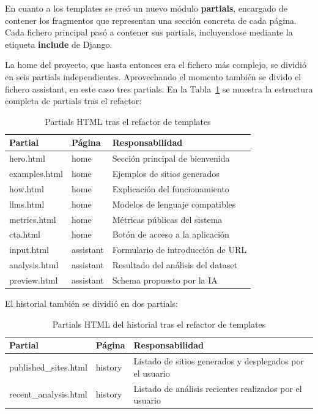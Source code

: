 En cuanto a los templates se creó un nuevo módulo \textbf{partials}, encargado de contener los fragmentos que representan una sección concreta de cada página. Cada fichero principal pasó a contener sus partials, incluyendose mediante la etiqueta \textbf{include} de Django.

La home del proyecto, que hasta entonces era el fichero más complejo, se dividió en seis partials independientes. Aprovechando el momento también se divido el fichero assistant, en este caso tres partials. En la Tabla~\ref{tab:partials-html} se muestra la estructura completa de partials tras el refactor:

\begin{table}[H]
    \centering
    \begin{tabular}{|l|l|p{5cm}|}
        \hline
        \textbf{Partial} & \textbf{Página} & \textbf{Responsabilidad} \\
        \hline
        hero.html & home & Sección principal de bienvenida \\
        \hline
        examples.html & home & Ejemplos de sitios generados \\
        \hline
        how.html & home & Explicación del funcionamiento \\
        \hline
        llms.html & home & Modelos de lenguaje compatibles \\
        \hline
        metrics.html & home & Métricas públicas del sistema \\
        \hline
        cta.html & home & Botón de acceso a la aplicación \\
        \hline
        input.html & assistant & Formulario de introducción de URL \\
        \hline
        analysis.html & assistant & Resultado del análisis del dataset \\
        \hline
        preview.html & assistant & Schema propuesto por la IA \\
        \hline
    \end{tabular}
    \caption{Partials HTML tras el refactor de templates}
    \label{tab:partials-html}
\end{table}

El historial también se dividió en dos partials:

\begin{table}[H]
    \centering
    \begin{tabular}{|l|l|p{5cm}|}
    \hline
    \textbf{Partial} & \textbf{Página} & \textbf{Responsabilidad} \\
    \hline
        published\_sites.html & history & Listado de sitios generados y desplegados por el usuario \\
    \hline
        recent\_analysis.html & history & Listado de análisis recientes realizados por el usuario \\
    \hline
    \end{tabular}
    \caption{Partials HTML del historial tras el refactor de templates}
    \label{tab:partials-history}
\end{table}

